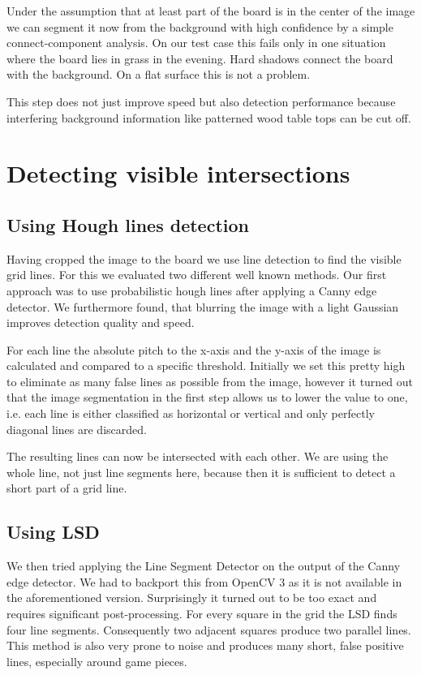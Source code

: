 	Under the assumption that at least part of the board is in the center of the image we can segment it now from the background with high confidence by a simple connect-component analysis. On our test case this fails only in one situation where the board lies in grass in the evening. Hard shadows connect the board with the background. On a flat surface this is not a problem.

	This step does not just improve speed but also detection performance because interfering background information like patterned wood table tops can be cut off.

	\section{Detecting visible intersections}
	\subsection{Using Hough lines detection}
	\label{detector-visible-hough}
	Having cropped the image to the board we use line detection to find the visible grid lines. For this we evaluated two different well known methods. Our first approach was to use probabilistic hough lines after applying a Canny edge detector. We furthermore found, that blurring the image with a light Gaussian improves detection quality and speed.

	For each line the absolute pitch to the x-axis and the y-axis of the image is calculated and compared to a specific threshold. Initially we set this pretty high to eliminate as many false lines as possible from the image, however it turned out that the image segmentation in the first step allows us to lower the value to one, i.e. each line is either classified as horizontal or vertical and only perfectly diagonal lines are discarded.

	The resulting lines can now be intersected with each other. We are using the whole line, not just line segments here, because then it is sufficient to detect a short part of a grid line.

	\subsection{Using LSD}
	\label{detector-visible-lsd}
	We then tried applying the Line Segment Detector \cite{} on the output of the Canny edge detector. We had to backport this from OpenCV 3 as it is not available in the aforementioned version. Surprisingly it turned out to be too exact and requires significant post-processing. For every square in the grid the LSD finds four line segments. Consequently two adjacent squares produce two parallel lines. This method is also very prone to noise and produces many short, false positive lines, especially around game pieces.

